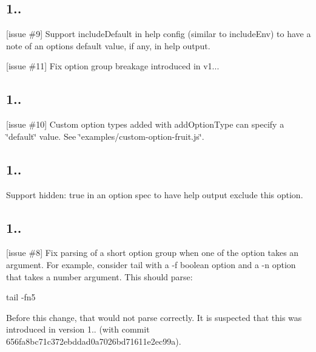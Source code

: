 \subsection*{1..}


\begin{DoxyItemize}
\item \mbox{[}issue \#9\mbox{]} Support {\ttfamily include\+Default} in help config (similar to {\ttfamily include\+Env}) to have a note of an option\textquotesingle{}s default value, if any, in help output.
\item \mbox{[}issue \#11\mbox{]} Fix option group breakage introduced in v1...
\end{DoxyItemize}

\subsection*{1..}


\begin{DoxyItemize}
\item \mbox{[}issue \#10\mbox{]} Custom option types added with {\ttfamily add\+Option\+Type} can specify a \char`\"{}default\char`\"{} value. See \char`\"{}examples/custom-\/option-\/fruit.\+js\char`\"{}.
\end{DoxyItemize}

\subsection*{1..}


\begin{DoxyItemize}
\item Support {\ttfamily hidden\+: true} in an option spec to have help output exclude this option.
\end{DoxyItemize}

\subsection*{1..}


\begin{DoxyItemize}
\item \mbox{[}issue \#8\mbox{]} Fix parsing of a short option group when one of the option takes an argument. For example, consider {\ttfamily tail} with a {\ttfamily -\/f} boolean option and a {\ttfamily -\/n} option that takes a number argument. This should parse\+: \begin{DoxyVerb}  tail -fn5
\end{DoxyVerb}


Before this change, that would not parse correctly. It is suspected that this was introduced in version 1.. (with commit 656fa8bc71c372ebddad0a7026bd71611e2ec99a).
\end{DoxyItemize}


